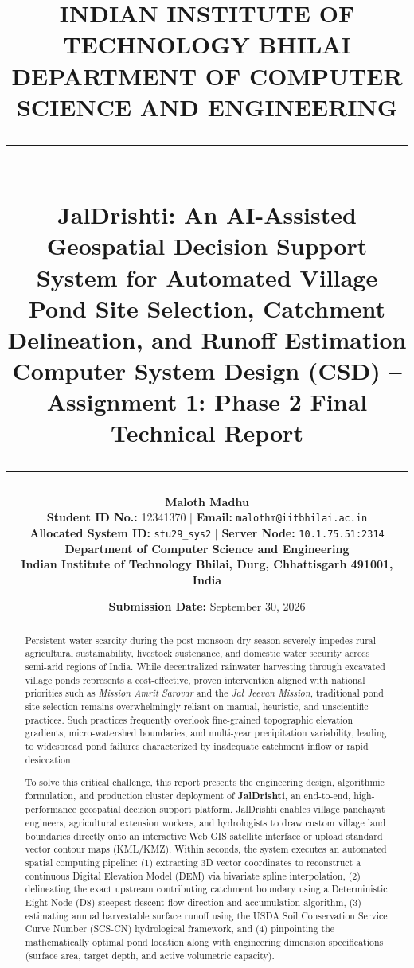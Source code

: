 \documentclass[11pt,a4paper]{article}
\title{
    \vspace{-1.2cm}
    \textbf{\Large INDIAN INSTITUTE OF TECHNOLOGY BHILAI}\\
    \textbf{\normalsize DEPARTMENT OF COMPUTER SCIENCE AND ENGINEERING}\\[0.3cm]
    \rule{\linewidth}{1.2pt}\\[0.3cm]
    \textbf{\LARGE JalDrishti: An AI-Assisted Geospatial Decision Support System for Automated Village Pond Site Selection, Catchment Delineation, and Runoff Estimation}\\[0.2cm]
    \large\textbf{Computer System Design (CSD) -- Assignment 1: Phase 2 Final Technical Report}\\[-0.2cm]
    \rule{\linewidth}{1.2pt}
}
\author{
    \textbf{Maloth Madhu}\\
    \textbf{Student ID No.:} 12341370 \quad $\vert$ \quad \textbf{Email:} \texttt{malothm@iitbhilai.ac.in}\\
    \textbf{Allocated System ID:} \texttt{stu29\_sys2} \quad $\vert$ \quad \textbf{Server Node:} \texttt{10.1.75.51:2314}\\
    \textbf{Department of Computer Science and Engineering}\\
    \textbf{Indian Institute of Technology Bhilai, Durg, Chhattisgarh 491001, India}
}
\date{\textbf{Submission Date:} September 30, 2026}
\begin{document}
\maketitle
\thispagestyle{fancy}

\begin{abstract}
\noindent
Persistent water scarcity during the post-monsoon dry season severely impedes rural agricultural sustainability, livestock sustenance, and domestic water security across semi-arid regions of India. While decentralized rainwater harvesting through excavated village ponds represents a cost-effective, proven intervention aligned with national priorities such as \textit{Mission Amrit Sarovar} and the \textit{Jal Jeevan Mission}, traditional pond site selection remains overwhelmingly reliant on manual, heuristic, and unscientific practices. Such practices frequently overlook fine-grained topographic elevation gradients, micro-watershed boundaries, and multi-year precipitation variability, leading to widespread pond failures characterized by inadequate catchment inflow or rapid desiccation.

To solve this critical challenge, this report presents the engineering design, algorithmic formulation, and production cluster deployment of \textbf{JalDrishti}, an end-to-end, high-performance geospatial decision support platform. JalDrishti enables village panchayat engineers, agricultural extension workers, and hydrologists to draw custom village land boundaries directly onto an interactive Web GIS satellite interface or upload standard vector contour maps (KML/KMZ). Within seconds, the system executes an automated spatial computing pipeline: (1) extracting 3D vector coordinates to reconstruct a continuous Digital Elevation Model (DEM) via bivariate spline interpolation, (2) delineating the exact upstream contributing catchment boundary using a Deterministic Eight-Node (D8) steepest-descent flow direction and accumulation algorithm, (3) estimating annual harvestable surface runoff using the USDA Soil Conservation Service Curve Number (SCS-CN) hydrological framework, and (4) pinpointing the mathematically optimal pond location along with engineering dimension specifications (surface area, target depth, and active volumetric capacity).


\end{abstract}
\end{document}
